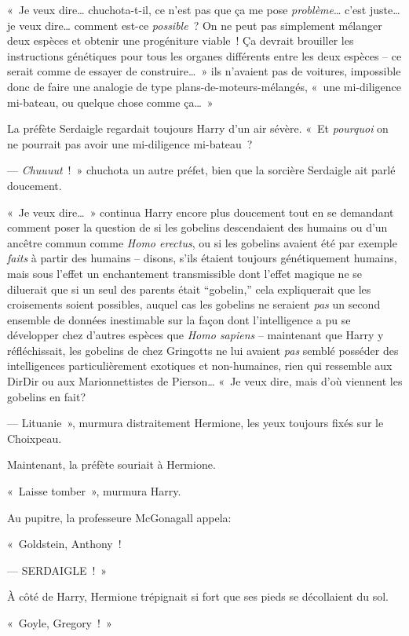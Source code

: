 «~Je veux dire… chuchota-t-il, ce n'est pas que ça me pose \emph{problème}… c'est juste… je veux dire… comment est-ce \emph{possible}~?
On ne peut pas simplement mélanger deux espèces et obtenir une progéniture viable~!
Ça devrait brouiller les instructions génétiques pour tous les organes différents entre les deux espèces -- ce serait comme de essayer de construire…~» ils n'avaient pas de voitures, impossible donc de faire une analogie de type plans-de-moteurs-mélangés, «~une mi-diligence mi-bateau, ou quelque chose comme ça…~»

La préfète Serdaigle regardait toujours Harry d'un air sévère.
«~Et \emph{pourquoi} on ne pourrait pas avoir une mi-diligence mi-bateau~?

--- \emph{Chuuuut}~!~» chuchota un autre préfet, bien que la sorcière Serdaigle ait parlé doucement.

«~Je veux dire…~» continua Harry encore plus doucement tout en se demandant comment poser la question de si les gobelins descendaient des humains ou d'un ancêtre commun comme \emph{Homo erectus}, ou si les gobelins avaient été par exemple \emph{faits} à partir des humains --
disons, s'ils étaient toujours génétiquement humains, mais sous l'effet un enchantement transmissible dont l'effet magique ne se diluerait que si un seul des parents était “gobelin,” cela expliquerait que les croisements soient possibles, auquel cas les gobelins ne seraient \emph{pas} un second ensemble de données inestimable sur la façon dont l'intelligence a pu se développer chez d'autres espèces que \emph{Homo sapiens} --
maintenant que Harry y réfléchissait, les gobelins de chez Gringotts ne lui avaient \emph{pas} semblé posséder des intelligences particulièrement exotiques et non-humaines, rien qui ressemble aux DirDir ou aux Marionnettistes de Pierson…
«~Je veux dire, mais d'où viennent les gobelins en fait?

--- Lituanie~», murmura distraitement Hermione, les yeux toujours fixés sur le Choixpeau.

Maintenant, la préfète souriait à Hermione.

«~Laisse tomber~», murmura Harry.

Au pupitre, la professeure McGonagall appela:

«~Goldstein, Anthony~!

--- SERDAIGLE~!~»

À côté de Harry, Hermione trépignait si fort que ses pieds se décollaient du sol.

«~Goyle, Gregory~!~»

